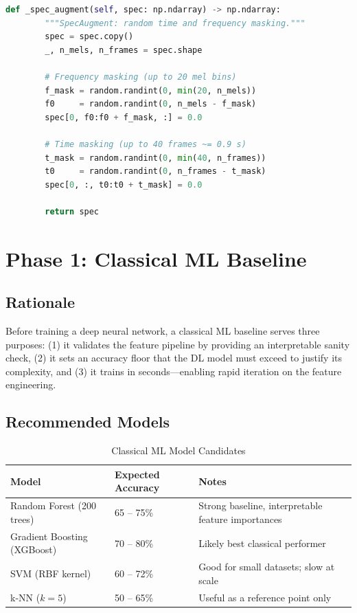 \documentclass[11pt,a4paper]{article}
\begin{document}
\begin{lstlisting}[language=Python, caption={PyTorch Dataset Wrappers}]
    def _spec_augment(self, spec: np.ndarray) -> np.ndarray:
        """SpecAugment: random time and frequency masking."""
        spec = spec.copy()
        _, n_mels, n_frames = spec.shape

        # Frequency masking (up to 20 mel bins)
        f_mask = random.randint(0, min(20, n_mels))
        f0     = random.randint(0, n_mels - f_mask)
        spec[0, f0:f0 + f_mask, :] = 0.0

        # Time masking (up to 40 frames ~= 0.9 s)
        t_mask = random.randint(0, min(40, n_frames))
        t0     = random.randint(0, n_frames - t_mask)
        spec[0, :, t0:t0 + t_mask] = 0.0

        return spec
\end{lstlisting}

\section{Phase 1: Classical ML Baseline}

\subsection{Rationale}

Before training a deep neural network, a classical ML baseline serves three
purposes: (1) it validates the feature pipeline by providing an interpretable
sanity check, (2) it sets an accuracy floor that the DL model must exceed to
justify its complexity, and (3) it trains in seconds---enabling rapid iteration
on the feature engineering.

\subsection{Recommended Models}

\begin{table}[h]
\centering
\caption{Classical ML Model Candidates}
\begin{tabular}{@{}p{4cm}p{4cm}p{5cm}@{}}
\toprule
\textbf{Model} & \textbf{Expected Accuracy} & \textbf{Notes} \\
\midrule
Random Forest (200 trees) & 65 -- 75\% & Strong baseline, interpretable feature importances \\
Gradient Boosting (XGBoost) & 70 -- 80\% & Likely best classical performer \\
SVM (RBF kernel) & 60 -- 72\% & Good for small datasets; slow at scale \\
k-NN ($k=5$) & 50 -- 65\% & Useful as a reference point only \\
\bottomrule
\end{tabular}
\end{table}
\end{document}
